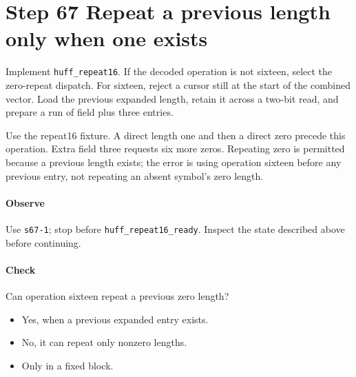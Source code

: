 \section{Step 67 Repeat a previous length only when one exists}\label{png-huff-s67}
Implement \texttt{huff\_repeat16}. If the decoded operation is not sixteen, select the zero-repeat dispatch. For sixteen, reject a cursor still at the start of the combined vector. Load the previous expanded length, retain it across a two-bit read, and prepare a run of field plus three entries.

Use the repeat16 fixture. A direct length one and then a direct zero precede this operation. Extra field three requests six more zeros. Repeating zero is permitted because a previous length exists; the error is using operation sixteen before any previous entry, not repeating an absent symbol's zero length.

\paragraph{Observe} Use \texttt{s67-1}; stop before \texttt{huff\_repeat16\_ready}. Inspect the state described above before continuing.

\paragraph{Check} Can operation sixteen repeat a previous zero length?
\begin{itemize}
  \item[A.] Yes, when a previous expanded entry exists.
  \item[B.] No, it can repeat only nonzero lengths.
  \item[C.] Only in a fixed block.
\end{itemize}
